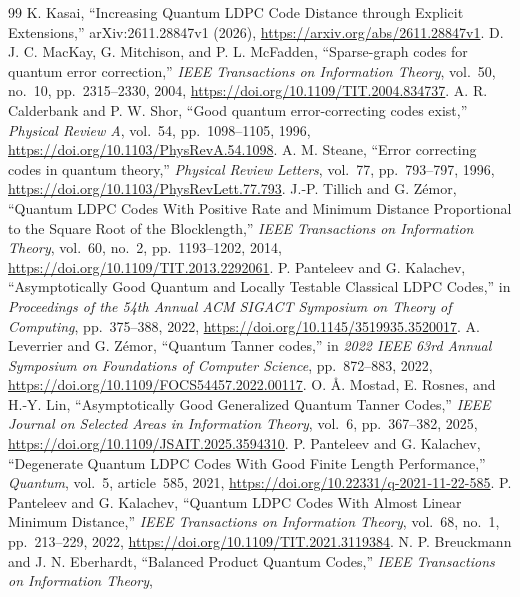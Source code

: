 \begingroup
\footnotesize
\begin{thebibliography}{99}
\setlength{\itemsep}{0pt}
\setlength{\parsep}{0pt}
K. Kasai, ``Increasing Quantum LDPC Code Distance through
Explicit Extensions,'' arXiv:2611.28847v1 (2026),
\url{https://arxiv.org/abs/2611.28847v1}.
D. J. C. MacKay, G. Mitchison, and P. L. McFadden,
``Sparse-graph codes for quantum error correction,'' \emph{IEEE Transactions
on Information Theory}, vol.~50, no.~10, pp.~2315--2330, 2004,
\url{https://doi.org/10.1109/TIT.2004.834737}.
A. R. Calderbank and P. W. Shor, ``Good quantum error-correcting
codes exist,'' \emph{Physical Review A}, vol.~54, pp.~1098--1105, 1996,
\url{https://doi.org/10.1103/PhysRevA.54.1098}.
A. M. Steane, ``Error correcting codes in quantum theory,''
\emph{Physical Review Letters}, vol.~77, pp.~793--797, 1996,
\url{https://doi.org/10.1103/PhysRevLett.77.793}.
J.-P. Tillich and G. Z\'emor,
``Quantum LDPC Codes With Positive Rate and Minimum Distance Proportional
to the Square Root of the Blocklength,'' \emph{IEEE Transactions on Information Theory},
vol.~60, no.~2, pp.~1193--1202, 2014,
\url{https://doi.org/10.1109/TIT.2013.2292061}.
P. Panteleev and G. Kalachev,
``Asymptotically Good Quantum and Locally Testable Classical LDPC Codes,''
in \emph{Proceedings of the 54th Annual ACM SIGACT Symposium on Theory of Computing},
pp.~375--388, 2022, \url{https://doi.org/10.1145/3519935.3520017}.
A. Leverrier and G. Z\'emor, ``Quantum Tanner codes,''
in \emph{2022 IEEE 63rd Annual Symposium on Foundations of Computer Science},
pp.~872--883, 2022, \url{https://doi.org/10.1109/FOCS54457.2022.00117}.
O. {\AA}. Mostad, E. Rosnes, and H.-Y. Lin,
``Asymptotically Good Generalized Quantum Tanner Codes,''
\emph{IEEE Journal on Selected Areas in Information Theory}, vol.~6,
pp.~367--382, 2025, \url{https://doi.org/10.1109/JSAIT.2025.3594310}.
P. Panteleev and G. Kalachev,
``Degenerate Quantum LDPC Codes With Good Finite Length Performance,''
\emph{Quantum}, vol.~5, article~585, 2021,
\url{https://doi.org/10.22331/q-2021-11-22-585}.
P. Panteleev and G. Kalachev, ``Quantum LDPC Codes With Almost
Linear Minimum Distance,'' \emph{IEEE Transactions on Information Theory},
vol.~68, no.~1, pp.~213--229, 2022,
\url{https://doi.org/10.1109/TIT.2021.3119384}.
N. P. Breuckmann and J. N. Eberhardt,
``Balanced Product Quantum Codes,'' \emph{IEEE Transactions on Information Theory},

\end{thebibliography}
